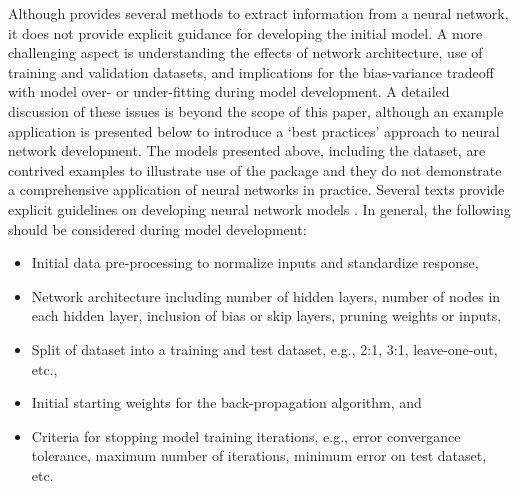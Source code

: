 \documentclass[article,shortnames]{jss}\usepackage[]{graphicx}\usepackage[]{color}
\begin{document}
Although  provides several methods to extract information from a neural network, it does not provide explicit guidance for developing the initial model.  A more challenging aspect is understanding the effects of network architecture, use of training and validation datasets, and implications for the bias-variance tradeoff with model over- or under-fitting during model development.  A detailed discussion of these issues is beyond the scope of this paper, although an example application is presented below to introduce a `best practices' approach to neural network development.  The models presented above, including the  dataset, are contrived examples to illustrate use of the  package and they do not demonstrate a comprehensive application of neural networks in practice.  Several texts provide explicit guidelines on developing neural network models \cite[e.g.,][]{Ripley96, Lek00, Maier00}.  In general, the following should be considered during model development:
\begin{itemize}
\item Initial data pre-processing to normalize inputs and standardize response,
\item Network architecture including number of hidden layers, number of nodes in each hidden layer, inclusion of bias or skip layers, pruning weights or inputs,
\item Split of dataset into a training and test dataset, e.g., 2:1, 3:1, leave-one-out, etc., 
\item Initial starting weights for the back-propagation algorithm, and
\item Criteria for stopping model training iterations, e.g., error convergance tolerance, maximum number of iterations, minimum error on test dataset, etc.
\end{itemize}
\end{document}
